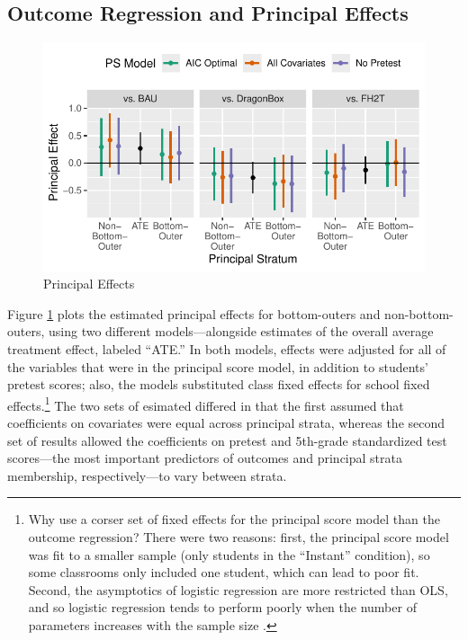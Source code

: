 \documentclass[11pt]{article} %
\begin{document}
\subsection{Outcome Regression and Principal Effects}
\begin{figure}
  \centering
  \includegraphics{../figure/prinEffs.pdf}
  \caption{Principal Effects}
  \label{fig:effects}
\end{figure}

Figure \ref{fig:effects} plots the estimated principal effects for bottom-outers and non-bottom-outers, using two different models---alongside estimates of the overall average treatment effect, labeled ``ATE.'' In both models, effects were adjusted for all of the variables that were in the principal score model, in addition to students' pretest scores; also, the models substituted class fixed effects for school fixed effects.\footnote{Why use a corser set of fixed effects for the principal score model than the outcome regression? There were two reasons: first, the principal score model was fit to a smaller sample (only students in the ``Instant'' condition), so some classrooms only included one student, which can lead to poor fit. Second, the asymptotics of logistic regression are more restricted than OLS, and so logistic regression tends to perform poorly when the number of parameters increases with the sample size \citep{agresti}.}
The two sets of esimated differed in that the first assumed that coefficients on covariates were equal across principal strata, whereas the second set of results allowed the coefficients on pretest and 5th-grade standardized test scores---the most important predictors of outcomes and principal strata membership, respectively---to vary between strata.
\end{document}
